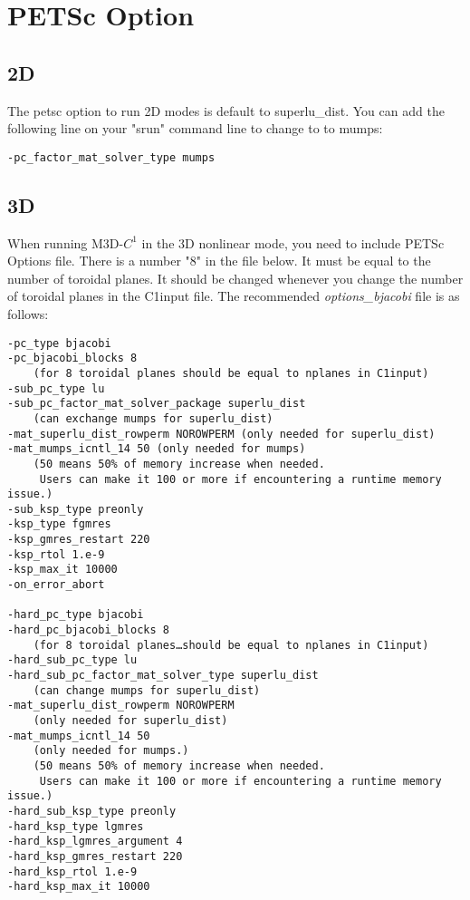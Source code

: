 \section{PETSc Option}
\label{petscoption}

\subsection{2D}

\noindent
The petsc option to run 2D modes is default to superlu\_dist. You can add the following line on your "srun" command line
to change to to mumps:

\begin{verbatim}
-pc_factor_mat_solver_type mumps
\end{verbatim}

\subsection{3D}

\noindent
When running M3D-$C^1$ in the 3D nonlinear mode, you need to include PETSc Options file.
There is a number "8" in the file below. It must be equal to the number of toroidal planes. It
should be changed whenever you change the number of toroidal planes in the C1input file. The recommended
{\it options\_bjacobi} file is as follows:

\begin{verbatim}
-pc_type bjacobi
-pc_bjacobi_blocks 8
    (for 8 toroidal planes should be equal to nplanes in C1input)
-sub_pc_type lu
-sub_pc_factor_mat_solver_package superlu_dist
    (can exchange mumps for superlu_dist)
-mat_superlu_dist_rowperm NOROWPERM (only needed for superlu_dist)
-mat_mumps_icntl_14 50 (only needed for mumps)
    (50 means 50% of memory increase when needed.
     Users can make it 100 or more if encountering a runtime memory issue.)
-sub_ksp_type preonly
-ksp_type fgmres
-ksp_gmres_restart 220
-ksp_rtol 1.e-9
-ksp_max_it 10000
-on_error_abort

-hard_pc_type bjacobi
-hard_pc_bjacobi_blocks 8
    (for 8 toroidal planes…should be equal to nplanes in C1input)
-hard_sub_pc_type lu
-hard_sub_pc_factor_mat_solver_type superlu_dist
    (can change mumps for superlu_dist)
-mat_superlu_dist_rowperm NOROWPERM
    (only needed for superlu_dist)
-mat_mumps_icntl_14 50
    (only needed for mumps.)
    (50 means 50% of memory increase when needed.
     Users can make it 100 or more if encountering a runtime memory issue.)
-hard_sub_ksp_type preonly
-hard_ksp_type lgmres
-hard_ksp_lgmres_argument 4
-hard_ksp_gmres_restart 220
-hard_ksp_rtol 1.e-9
-hard_ksp_max_it 10000
\end{verbatim}

